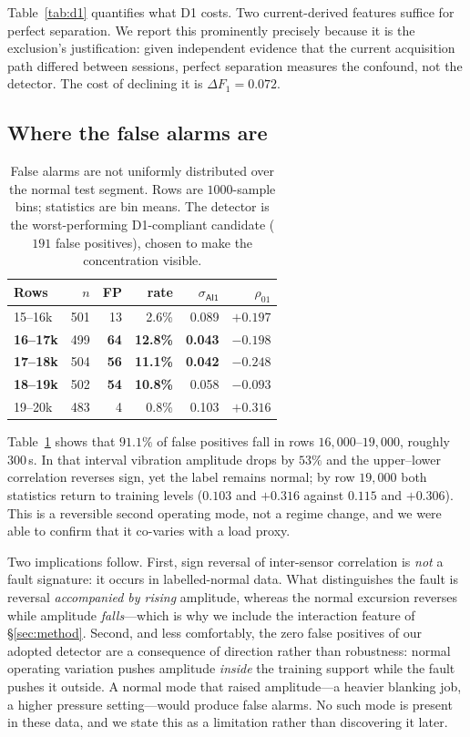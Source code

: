 \documentclass[twocolumn,10pt]{article}
\begin{document}
Table~\ref{tab:d1} quantifies what D1 costs. Two current-derived features
suffice for perfect separation. We report this prominently precisely because it
is the exclusion's justification: given independent evidence that the current
acquisition path differed between sessions, perfect separation measures the
confound, not the detector. The cost of declining it is $\Delta F_1 = 0.072$.

\subsection{Where the false alarms are}
\label{sec:fp}

\begin{table}[t]
\centering\small
\caption{False alarms are not uniformly distributed over the normal test
segment. Rows are $1000$-sample bins; statistics are bin means. The detector is
the worst-performing D1-compliant candidate ($191$ false positives), chosen to
make the concentration visible.}
\label{tab:fp}
\begin{tabular}{lrrrrr}
\toprule
Rows & $n$ & FP & rate & $\sigma_{\textsf{AI1}}$ & $\rho_{01}$ \\
\midrule
15--16k & 501 & 13 & 2.6\% & 0.089 & $+0.197$ \\
\textbf{16--17k} & 499 & \textbf{64} & \textbf{12.8\%} & \textbf{0.043} & $\mathbf{-0.198}$ \\
\textbf{17--18k} & 504 & \textbf{56} & \textbf{11.1\%} & \textbf{0.042} & $\mathbf{-0.248}$ \\
\textbf{18--19k} & 502 & \textbf{54} & \textbf{10.8\%} & 0.058 & $-0.093$ \\
19--20k & 483 & 4 & 0.8\% & 0.103 & $+0.316$ \\
\bottomrule
\end{tabular}
\end{table}

Table~\ref{tab:fp} shows that $91.1\%$ of false positives fall in rows
$16{,}000$--$19{,}000$, roughly $300$\,s. In that interval vibration amplitude
drops by $53\%$ and the upper--lower correlation reverses sign, yet the label
remains normal; by row $19{,}000$ both statistics return to training levels
($0.103$ and $+0.316$ against $0.115$ and $+0.306$). This is a reversible
second operating mode, not a regime change, and we were able to confirm that it
co-varies with a load proxy.

Two implications follow. First, sign reversal of inter-sensor correlation is
\emph{not} a fault signature: it occurs in labelled-normal data. What
distinguishes the fault is reversal \emph{accompanied by rising} amplitude,
whereas the normal excursion reverses while amplitude \emph{falls}---which is
why we include the interaction feature of \S\ref{sec:method}. Second, and less
comfortably, the zero false positives of our adopted detector are a consequence
of direction rather than robustness: normal operating variation pushes
amplitude \emph{inside} the training support while the fault pushes it outside.
A normal mode that raised amplitude---a heavier blanking job, a higher pressure
setting---would produce false alarms. No such mode is present in these data,
and we state this as a limitation rather than discovering it later.
\end{document}
